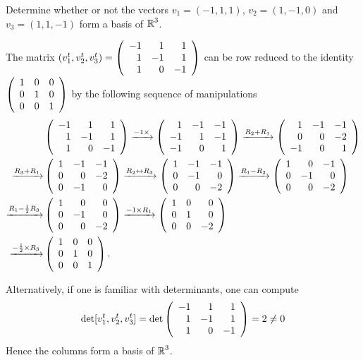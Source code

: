 \documentclass{ximera}
\author{Matthew Carr}
\begin{document}

\begin{exercise}\label{mc5_5A}

Determine whether or not the vectors  %
$v_1 = (-1,1,1)$, $v_2 = (1,-1,0)$ and $v_3 = (1,1,-1)$ 
form a basis of $\mbox{$\Bbb{R}$}^3$.
  
\begin{solution}
\soln The matrix $(v_1^t, v_2^t, v_3^t)=\left(\begin{array}{rrrrrrrrrrrrrrrrrr} -1 & 1 & 1\\ 1 & -1 & 1\\ 1 & 0 & -1 \end{array}\right)$ can be row reduced to the identity $\left(\begin{array}{rrrrrrrrrrrrrrrrrr} 1 & 0 & 0\\ 0 & 1 & 0\\ 0 & 0 & 1 \end{array}\right)$ by the following sequence of manipulations
\begin{align*}
&\left(\begin{array}{rrrrrrrrrrrrrrrrrr} -1 & 1 & 1\\ 1 & -1 & 1\\ 1 & 0 & -1 \end{array}\right)\xrightarrow{-1\times }\left(\begin{array}{rrrrrrrrrrrrrrrrrr} 1 & -1 & -1\\ -1 & 1 & -1\\ -1 & 0 & 1 \end{array}\right)\xrightarrow{R_2+R_1}\left(\begin{array}{rrrrrrrrrrrrrrrrrr} 1 & -1 & -1\\ 0 & 0 & -2\\ -1 & 0 & 1 \end{array}\right)\\
\xrightarrow{R_3+R_1}&\left(\begin{array}{rrrrrrrrrrrrrrrrrr} 1 & -1 & -1\\ 0 & 0 & -2\\ 0 & -1 & 0 \end{array}\right)\xrightarrow{R_2\leftrightarrow R_3}\left(\begin{array}{rrrrrrrrrrrrrrrrrr} 1 & -1 &-1\\ 0 & -1 & 0\\ 0 & 0 & -2 \end{array}\right)\xrightarrow{R_1-R_2}\left(\begin{array}{rrrrrrrrrrrrrrrrrr} 1 & 0 &-1\\ 0 & -1 & 0\\ 0 & 0 & -2 \end{array}\right)\\
\xrightarrow{R_1-\frac{1}{2}R_3}&\left(\begin{array}{rrrrrrrrrrrrrrrrrr} 1 & 0 &0\\ 0 & -1 & 0\\ 0 & 0 & -2 \end{array}\right)\xrightarrow{-1\times R_1}\left(\begin{array}{rrrrrrrrrrrrrrrrrr} 1 & 0 &0\\ 0 & 1 & 0\\ 0 & 0 & -2 \end{array}\right)\\
\xrightarrow{-\frac{1}{2}\times R_3}&\left(\begin{array}{rrrrrrrrrrrrrrrrrr} 1 & 0 &0\\ 0 & 1 & 0\\ 0 & 0 & 1 \end{array}\right)\ldotp
\end{align*}


Alternatively, if one is familiar with determinants, one can compute
\[
\det [v_1^t, v_2^t, v_3^t] =\det\left(\begin{array}{rrrrrrrrrrrrrrrrrr} -1 & 1 & 1\\ 1 & -1 & 1\\ 1 & 0 & -1 \end{array}\right) = 2 \neq 0
\]
Hence the columns form a basis of $\mbox{$\Bbb{R}$}^3$.
\end{solution}
\end{exercise}
\end{document}
